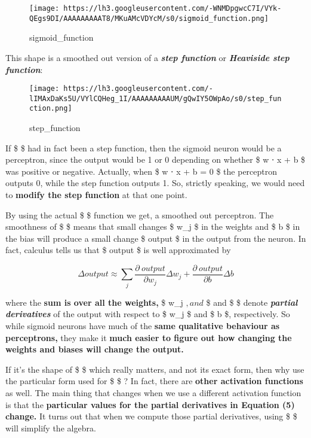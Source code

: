 \documentclass[]{article}
\begin{document}
\begin{figure}[htbp]
\centering
\texttt{[image: https://lh3.googleusercontent.com/-WNMDpgwcC7I/VYk-QEgs9DI/AAAAAAAAAT8/MKuAMcVDYcM/s0/sigmoid\_function.png]}
\caption{sigmoid\_function}
\end{figure}

This shape is a smoothed out version of a \textbf{\emph{step function}}
or \textbf{\emph{Heaviside step function}}:

\begin{figure}[htbp]
\centering
\texttt{[image: https://lh3.googleusercontent.com/-lIMAxDaKs5U/VYlCQHeg\_1I/AAAAAAAAAUM/gQwIY5OWpAo/s0/step\_function.png]}
\caption{step\_function}
\end{figure}

If \$ \sigma \$ had in fact been a step function, then the sigmoid
neuron would be a perceptron, since the output would be 1 or 0 depending
on whether \$ w ⋅ x + b \$ was positive or negative. Actually, when \$ w
⋅ x + b = 0 \$ the perceptron outputs 0, while the step function outputs
1. So, strictly speaking, we would need to \textbf{modify the step
function} at that one point.

By using the actual \$ \sigma \$ function we get, a smoothed out
perceptron. The smoothness of \$ \sigma \$ means that small changes \$
\Delta w\_j \$ in the weights and \$ \Delta b \$ in the bias will
produce a small change \$ \Delta output \$ in the output from the
neuron. In fact, calculus tells us that \$ \Delta output \$ is well
approximated by

\begin{equation}
    \Delta output \approx \sum_j 
    \frac {\partial \ output}{\partial w_j} \Delta w_j + 
    \frac {\partial \ output}{\partial b} \Delta b
\end{equation}

where the \textbf{sum is over all the weights,} \$ w\_j $, and $
 \$ and \$
 \$ denote \textbf{\emph{partial
derivatives}} of the output with respect to \$ w\_j \$ and \$ b \$,
respectively. So while sigmoid neurons have much of the \textbf{same
qualitative behaviour as perceptrons,} they make it \textbf{much easier
to figure out how changing the weights and biases will change the
output.}

If it's the shape of \$ \sigma \$ which really matters, and not its
exact form, then why use the particular form used for \$ \sigma \$ ? In
fact, there are \textbf{other activation functions} as well. The main
thing that changes when we use a different activation function is that
the \textbf{particular values for the partial derivatives in Equation
(5) change.} It turns out that when we compute those partial
derivatives, using \$ \sigma \$ will simplify the algebra.
\end{document}
